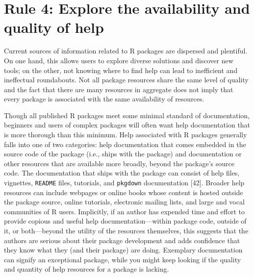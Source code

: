 \documentclass[10pt,letterpaper]{article}
\begin{document}
\hypertarget{rule-4-explore-the-availability-and-quality-of-help}{%
\section{Rule 4: Explore the availability and quality of
help}\label{rule-4-explore-the-availability-and-quality-of-help}}

Current sources of information related to R packages are dispersed and
plentiful. On one hand, this allows users to explore diverse solutions
and discover new tools; on the other, not knowing where to find help can
lead to inefficient and ineffectual roundabouts. Not all package
resources share the same level of quality and the fact that there are
many resources in aggregate does not imply that every package is
associated with the same availability of resources.

Though all published R packages meet some minimal standard of
documentation, beginners and users of complex packages will often want
help documentation that is more thorough than this minimum. Help
associated with R packages generally falls into one of two categories:
help documentation that comes embedded in the source code of the package
(i.e., ships with the package) and documentation or other resources that
are available more broadly, beyond the package's source code. The
documentation that ships with the package can consist of help files,
vignettes, \texttt{README} files, tutorials, and \texttt{pkgdown}
documentation {[}42{]}. Broader help resources can include webpages or
online books whose content is hosted outside the package source, online
tutorials, electronic mailing lists, and large and vocal communities of
R users. Implicitly, if an author has expended time and effort to
provide copious and useful help documentation---within package code,
outside of it, or both---beyond the utility of the resources themselves,
this suggests that the authors are serious about their package
development and adds confidence that they know what they (and their
package) are doing. Exemplary documentation can signify an exceptional
package, while you might keep looking if the quality and quantity of
help resources for a package is lacking.
\end{document}

